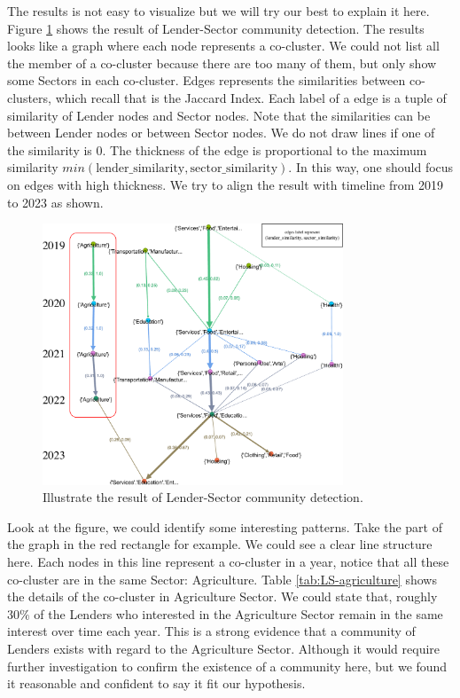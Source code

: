 % 

The results is not easy to visualize but we will try our best to explain it here.
Figure \ref{fig:appendix-LSector} shows the result of Lender-Sector community detection.
The results looks like a graph where each node represents a co-cluster.
We could not list all the member of a co-cluster because there are too many of them,
but only show some Sectors in each co-cluster.
Edges represents the similarities between co-clusters, which recall that is the Jaccard Index.
Each label of a edge is a tuple of similarity of Lender nodes and Sector nodes.
Note that the similarities can be between Lender nodes or between Sector nodes.
We do not draw lines if one of the similarity is $0$.
The thickness of the edge is proportional to the maximum similarity $min(\text{lender\_similarity}, \text{sector\_similarity})$.
In this way, one should focus on edges with high thickness.
We try to align the result with timeline from 2019 to 2023 as shown.

\begin{figure}[H]
	\centering
	\includegraphics[width=0.8\textwidth]{images/LSector.pdf}
	\caption{Illustrate the result of Lender-Sector community detection.}
	\label{fig:appendix-LSector}
\end{figure}

Look at the figure, we could identify some interesting patterns.
Take the part of the graph in the red rectangle for example.
We could see a clear line structure here.
Each nodes in this line represent a co-cluster in a year,
notice that all these co-cluster are in the same Sector: Agriculture.
Table \ref{tab:LS-agriculture} shows the details of the co-cluster in Agriculture Sector.
We could state that, roughly $30\%$ of the Lenders who interested in the Agriculture Sector
remain in the same interest over time each year.
This is a strong evidence that a community of Lenders exists with regard to the Agriculture Sector.
Although it would require further investigation to confirm the existence of a community here,
but we found it reasonable and confident to say it fit our hypothesis.

